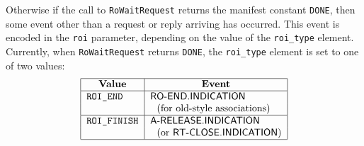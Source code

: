 Otherwise if the call to \verb"RoWaitRequest" returns the manifest constant
\verb"DONE",
then some event other than a request or reply arriving has occurred.
This event is encoded in the \verb"roi" parameter,
depending on the value of the \verb"roi_type" element.
Currently,
when \verb"RoWaitRequest" returns \verb"DONE",
the \verb"roi_type" element is set to one of two values:
\[\begin{tabular}{|l|l|}
\hline
    \multicolumn{1}{|c|}{\bf Value}&
			\multicolumn{1}{c|}{\bf Event}\\
\hline
    \tt ROI\_END&	\sf RO-END.INDICATION\\
	&		\ \ (for old-style associations)\\
\hline
    \tt ROI\_FINISH&	\sf A-RELEASE.INDICATION\\
	&		\ \ (or {\sf RT-CLOSE.INDICATION\/})\\
\hline
\end{tabular}\]

